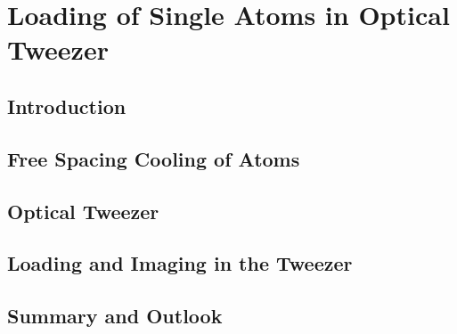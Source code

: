 
\chapter{Loading of Single Atoms in Optical Tweezer}
\label{ch:loading}

\section{Introduction}
\label{ch:loading:introduction}

\section{Free Spacing Cooling of Atoms}
\label{ch:loading:free-space}

\section{Optical Tweezer}
\label{ch:loading:tweezer}

\section{Loading and Imaging in the Tweezer}
\label{ch:loading:loading}

\section{Summary and Outlook}
\label{ch:loading:summary}
